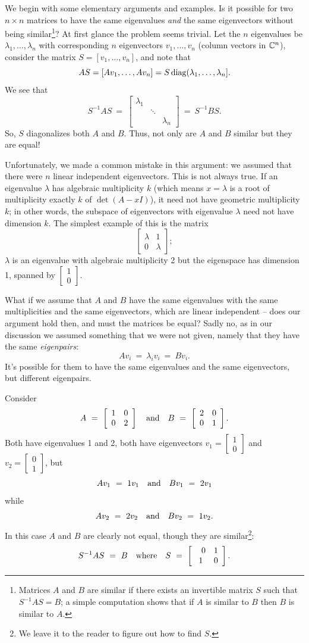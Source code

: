\documentclass{article}
\newcommand{\mattwo}[4]
{\left[\begin{array}{cc}
                        #1  & #2   \\
                        #3 &  #4
                          \end{array}\right] }
\newcommand{\vect}[1]{#1}%
\newcommand{\vectwo}[2]
{\left[\begin{array}{c}
                        #1   \\
                        #2
\end{array}\right] }
\newcommand{\matthree}[9]
{\left[\begin{array}{ccc}
                        #1  & #2 & #3  \\
                        #4 &  #5 & #6 \\
                        #7 &  #8 & #9
                          \end{array}\right] }
\begin{document}
We begin with some elementary arguments and examples. Is it possible for two $n \times n$ matrices to have the same eigenvalues \emph{and} the same eigenvectors without being similar\footnote{Matrices $A$ and $B$ are similar if there exists an invertible matrix $S$ such that $S^{-1} A S = B$; a simple computation shows that if $A$ is similar to $B$ then $B$ is similar to $A$.}? At first glance the problem seems trivial. Let the $n$ eigenvalues be $\lambda_1, \dots, \lambda_n$ with corresponding $n$ eigenvectors $\vect{v_1}, \dots, \vect{v_n}$ (column vectors in $\Bbb C^n$), consider the matrix $S=[v_1, \dots, v_n]$,
  and  note that
$$AS=[Av_1, \dots, Av_n]= S\,{\rm diag} (\lambda_1, \dots, \lambda_n].$$
We see that
$$S^{-1} A S \ = \ \matthree{\lambda_1}{}{}{}{\ddots}{}{}{}{\lambda_n} \ = \ S^{-1} B S.$$  So,  $S$ diagonalizes both $A$ and $B$. Thus,  not only are $A$ and $B$ similar but they are equal!
\medskip

Unfortunately, we made a common mistake in this argument:  we assumed that there were $n$ linear independent eigenvectors. This is not always true. If an eigenvalue $\lambda$ has algebraic multiplicity $k$ (which means $x = \lambda$ is a root of multiplicity exactly $k$ of $\det(A - x I)$), it need not have geometric multiplicity $k$; in other words, the subspace of eigenvectors with eigenvalue $\lambda$ need not have dimension $k$.
The simplest example of this is the matrix $$\mattwo{\lambda}{1}{0}{\lambda};$$ $\lambda$ is an eigenvalue with algebraic multiplicity 2 but the eigenspace has dimension 1, spanned by $\vectwo{1}{0}$.
\medskip


What if we assume that $A$ and $B$ have the same eigenvalues with the same multiplicities and the same eigenvectors, which are linear independent -- does our argument hold then, and must the matrices be equal? Sadly no, as in our discussion we assumed something that we were not given, namely that they have the same \emph{eigenpairs}: $$A \vect{v_i} \ = \ \lambda_i \vect{v_i} \ = \ B \vect{v_i}.$$ It's possible for them to have the same eigenvalues and the same eigenvectors, but different eigenpairs.
\medskip

 Consider $$A \ = \ \mattwo{1}{0}{0}{2} \ \ \ {\rm  and} \ \ \ B \ = \ \mattwo{2}{0}{0}{1}.$$ Both have eigenvalues 1 and 2, both have eigenvectors $\vect{v_1} = \vectwo{1}{0}$ and $\vect{v_2} = \vectwo{0}{1}$, but $$A \vect{v_1} \ = \ 1 \vect{v_1} \ \ \ {\rm and} \ \ \ B \vect{v_1} \ = \ 2 \vect{v_1}$$ while $$A \vect{v_2} \ = \ 2 \vect{v_2} \ \ \ {\rm and} \ \ \ B \vect{v_2} \ = \ 1 \vect{v_2}.$$ In this case $A$ and $B$ are clearly not equal, though they are similar\footnote{We leave it to the reader to figure out how to find $S$.}: $$S^{-1} A S \ = \ B \ \ \ {\rm  where} \ \ \ S \ = \ \mattwo{\ \ 0}{1}{1}{0}.$$
\end{document}
